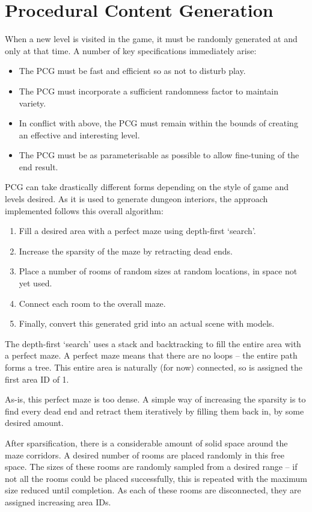 \documentclass[a4paper, oneside, 11pt]{report}
\begin{document}
\section{Procedural Content Generation}
When a new level is visited in the game, it must be randomly generated at and only at that time. A number of key specifications immediately arise:

\begin{itemize}
    \item The PCG must be fast and efficient so as not to disturb play.
    \item The PCG must incorporate a sufficient randomness factor to maintain variety.
    \item In conflict with above, the PCG must remain within the bounds of creating an effective and interesting level.
    \item The PCG must be as parameterisable as possible to allow fine-tuning of the end result.
\end{itemize}

PCG can take drastically different forms depending on the style of game and levels desired. As it is used to generate dungeon interiors, the approach implemented follows this overall algorithm:

\begin{enumerate}
    \item Fill a desired area with a perfect maze using depth-first `search'.
    \item Increase the sparsity of the maze by retracting dead ends.
    \item Place a number of rooms of random sizes at random locations, in space not yet used.
    \item Connect each room to the overall maze.
    \item Finally, convert this generated grid into an actual scene with models.
\end{enumerate}

The depth-first `search' uses a stack and backtracking to fill the entire area with a perfect maze. A perfect maze means that there are no loops -- the entire path forms a tree. This entire area is naturally (for now) connected, so is assigned the first area ID of 1.

As-is, this perfect maze is too dense. A simple way of increasing the sparsity is to find every dead end and retract them iteratively by filling them back in, by some desired amount.

After sparsification, there is a considerable amount of solid space around the maze corridors. A desired number of rooms are placed randomly in this free space. The sizes of these rooms are randomly sampled from a desired range -- if not all the rooms could be placed successfully, this is repeated with the maximum size reduced until completion. As each of these rooms are disconnected, they are assigned increasing area IDs.
\end{document}
